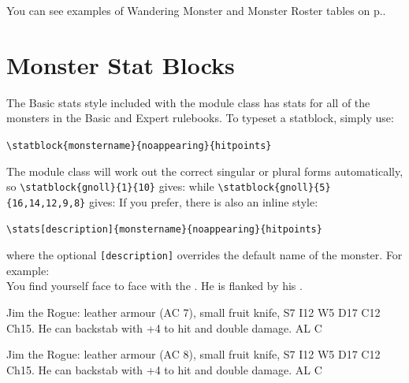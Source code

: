 \documentclass[letterpaper,serif]{module}
\begin{document}
You can see examples of Wandering Monster and Monster Roster tables on p.\pageref{wanderingmonsters}.

\section{Monster Stat Blocks}
\label{stat_blocks}

The Basic stats style included with the module class has stats for all of the monsters in the Basic and Expert rulebooks.
To typeset a statblock, simply use:
\begin{statblockfreestyle}
\verb|\statblock{monstername}{noappearing}{hitpoints}|
\end{statblockfreestyle}
The module class will work out the correct singular or plural forms automatically, so
\verb|\statblock{gnoll}{1}{10}| gives:
while \verb|\statblock{gnoll}{5}{16,14,12,9,8}| gives:
If you prefer, there is also an inline style:
\begin{statblockfreestyle}
\hspace{-1em}\verb|\stats[description]{monstername}{noappearing}{hitpoints}|
\end{statblockfreestyle}
where the optional \verb|[description]| overrides the default name of the monster.
For example:\\[0.15em]

\noindent You find yourself face to face with the . He is flanked
by his .


\begin{statblockfreestyle}
\begin{ifbasicstats}
Jim the Rogue: leather armour (AC 7), small fruit knife, S7 I12 W5 D17 C12 Ch15. He can backstab with +4 to hit and double damage. AL C
\end{ifbasicstats}
\begin{ifadvancedstats}
Jim the Rogue: leather armour (AC 8), small fruit knife, S7 I12 W5 D17 C12 Ch15. He can backstab with +4 to hit and double damage. AL C
\end{ifadvancedstats}
\end{statblockfreestyle}



\end{document}
